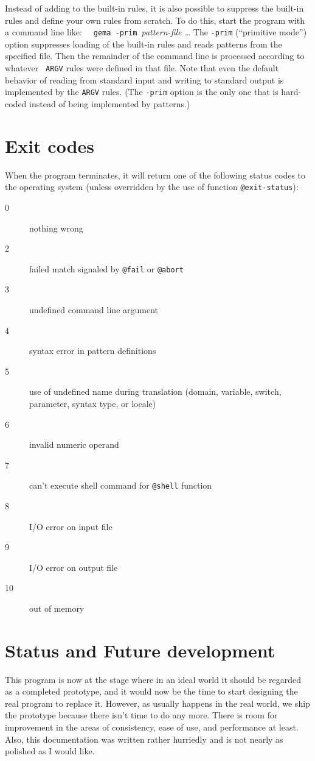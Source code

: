 Instead of adding to the built-in rules, it is also possible to suppress
the built-in rules and define your own rules from scratch.  To do this,
start the program with a command line like:\newline
\verb|  gema -prim |{\em pattern-file  \ldots}
\newline
The \verb/-prim/ (``primitive mode'') option suppresses loading of the
built-in rules and reads patterns from the specified file.  Then the
remainder of the command line is processed according to whatever {\tt
ARGV} rules were defined in that file.
Note that even the default behavior of reading from standard input and
writing to standard output is implemented by the {\tt ARGV} rules.
(The \verb/-prim/ option is the only one that is hard-coded instead of
being implemented by patterns.)

\pagebreak[3]
\section{Exit codes}
When the program terminates, it will return one of the following status
codes to the operating system (unless overridden by the use of function
\verb/@exit-status/): 
\begin{description}
\item[0]  nothing wrong 
\item[2]  failed match signaled by \verb/@fail/ or \verb/@abort/ 
\item[3]  undefined command line argument 
\item[4]  syntax error in pattern definitions 
\item[5]  use of undefined name during translation
	   (domain, variable, switch, parameter, syntax type, or locale) 
\item[6]  invalid numeric operand 
\item[7]  can't execute shell command for \verb/@shell/ function
\item[8]  I/O error on input file 
\item[9]  I/O error on output file 
\item[10] out of memory 
\end{description}

\section{Status and Future development}

This program is now at the stage where in an ideal world it should be
regarded as a completed prototype, and it would now be the time to start
designing the real program to replace it.  However, as usually happens
in the real world, we ship the prototype because there isn't time to do
any more.  There is room for improvement in the areas of consistency,
ease of use, and performance at least.
Also, this documentation was written rather hurriedly and is not nearly as
polished as I would like.

